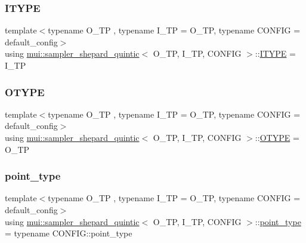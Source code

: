 \subsubsection{\texorpdfstring{I\+T\+Y\+PE}{ITYPE}}
{\footnotesize\ttfamily template$<$typename O\+\_\+\+TP , typename I\+\_\+\+TP  = O\+\_\+\+TP, typename C\+O\+N\+F\+IG  = default\+\_\+config$>$ \\
using \hyperlink{classmui_1_1sampler__shepard__quintic}{mui\+::sampler\+\_\+shepard\+\_\+quintic}$<$ O\+\_\+\+TP, I\+\_\+\+TP, C\+O\+N\+F\+IG $>$\+::\hyperlink{classmui_1_1sampler__shepard__quintic_a449ad1b058df2448a50dab7822626fa6}{I\+T\+Y\+PE} =  I\+\_\+\+TP}

\mbox{\label{classmui_1_1sampler__shepard__quintic_ae71df3379dbdc49abd163d49eb310411}} 
\subsubsection{\texorpdfstring{O\+T\+Y\+PE}{OTYPE}}
{\footnotesize\ttfamily template$<$typename O\+\_\+\+TP , typename I\+\_\+\+TP  = O\+\_\+\+TP, typename C\+O\+N\+F\+IG  = default\+\_\+config$>$ \\
using \hyperlink{classmui_1_1sampler__shepard__quintic}{mui\+::sampler\+\_\+shepard\+\_\+quintic}$<$ O\+\_\+\+TP, I\+\_\+\+TP, C\+O\+N\+F\+IG $>$\+::\hyperlink{classmui_1_1sampler__shepard__quintic_ae71df3379dbdc49abd163d49eb310411}{O\+T\+Y\+PE} =  O\+\_\+\+TP}

\mbox{\label{classmui_1_1sampler__shepard__quintic_ac80518ba9645191b9d6e2fbee760e031}} 
\subsubsection{\texorpdfstring{point\+\_\+type}{point\_type}}
{\footnotesize\ttfamily template$<$typename O\+\_\+\+TP , typename I\+\_\+\+TP  = O\+\_\+\+TP, typename C\+O\+N\+F\+IG  = default\+\_\+config$>$ \\
using \hyperlink{classmui_1_1sampler__shepard__quintic}{mui\+::sampler\+\_\+shepard\+\_\+quintic}$<$ O\+\_\+\+TP, I\+\_\+\+TP, C\+O\+N\+F\+IG $>$\+::\hyperlink{classmui_1_1sampler__shepard__quintic_ac80518ba9645191b9d6e2fbee760e031}{point\+\_\+type} =  typename C\+O\+N\+F\+I\+G\+::point\+\_\+type}

